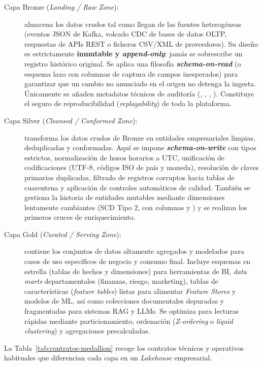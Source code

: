 \begin{description}
  \item[Capa Bronze (\textit{Landing / Raw Zone}):] almacena los datos crudos tal como llegan de las fuentes heterogéneas (eventos JSON de Kafka, volcado CDC de bases de datos OLTP, respuestas de APIs REST o ficheros CSV/XML de proveedores). Su diseño es estrictamente \textbf{inmutable y \textit{append-only}}: jamás se sobrescribe un registro histórico original. Se aplica una filosofía \textbf{\textit{schema-on-read}} (o esquema laxo con columnas de captura de campos inesperados) para garantizar que un cambio no anunciado en el origen no detenga la ingesta. Únicamente se añaden metadatos técnicos de auditoría (, , , ). Constituye el seguro de reproducibilidad (\textit{replayability}) de toda la plataforma.
  \item[Capa Silver (\textit{Cleansed / Conformed Zone}):] transforma los datos crudos de Bronze en entidades empresariales limpias, deduplicadas y conformadas. Aquí se impone \textbf{\textit{schema-on-write}} con tipos estrictos, normalización de husos horarios a UTC, unificación de codificaciones (UTF-8, códigos ISO de país y moneda), resolución de claves primarias duplicadas, filtrado de registros corruptos hacia tablas de cuarentena y aplicación de controles automáticos de calidad. También se gestiona la historia de entidades mutables mediante dimensiones lentamente cambiantes (SCD Tipo 2, con columnas  y ) y se realizan los primeros cruces de enriquecimiento.
  \item[Capa Gold (\textit{Curated / Serving Zone}):] contiene los conjuntos de datos altamente agregados y modelados para casos de uso específicos de negocio y consumo final. Incluye esquemas en estrella (tablas de hechos y dimensiones) para herramientas de BI, \textit{data marts} departamentales (finanzas, riesgo, marketing), tablas de características (\textit{feature tables}) listas para alimentar \textit{Feature Stores} y modelos de ML, así como colecciones documentales depuradas y fragmentadas para sistemas RAG y LLMs. Se optimiza para lecturas rápidas mediante particionamiento, ordenación (\textit{Z-ordering} o \textit{liquid clustering}) y agregaciones precalculadas.
\end{description}

La Tabla~\ref{tab:contratos-medallion} recoge los contratos técnicos y operativos habituales que diferencian cada capa en un \textit{Lakehouse} empresarial.

